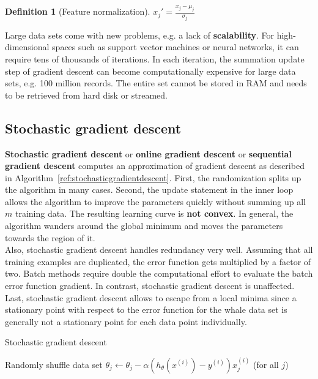 \documentclass{report}
\newtheorem{definition}{Definition}[section]
\begin{document}
\begin{definition}[Feature normalization]
$x_j' = \frac{x_j - \mu_j}{\sigma_j}$
\end{definition}

Large data sets come with new problems, e.g. a lack of {\bf scalability}.
For high-dimensional spaces such as support vector machines or neural networks, it can require tens of thousands of iterations.
In each iteration, the summation update step of gradient descent can become computationally expensive for large data sets, e.g. 100 million records.
The entire set cannot be stored in RAM and needs to be retrieved from hard disk or streamed.


\subsection{Stochastic gradient descent}

{\bf Stochastic gradient descent} or {\bf online gradient descent} or {\bf sequential gradient descent} computes an approximation of gradient descent as described in Algorithm~\ref{ref:stochasticgradientdescent}.
First, the randomization splits up the algorithm in many cases.
Second, the update statement in the inner loop allows the algorithm to improve the parameters quickly without summing up all $m$ training data.
The resulting learning curve is {\bf not convex}.
In general, the algorithm wanders around the global minimum and moves the parameters towards the region of it. \\
Also, stochastic gradient descent handles redundancy very well. Assuming that all training examples are duplicated, the error function gets multiplied by a factor of two. Batch methods require double the computational effort to evaluate the batch error function gradient. In contrast, stochastic gradient descent is unaffected.
Last, stochastic gradient descent allows to escape from a local minima since a stationary point with respect to the error function for the whale data set is generally not a stationary point for each data point individually.

\begin{algorithm}
\caption{Stochastic gradient descent}
\label{ref:stochasticgradientdescent}
\begin{algorithmic}
\State Randomly shuffle data set
\Repeat
{}
\State $\theta_j  \gets \theta_j - \alpha (h_\theta(x^{(i)})-y^{(i)})x_j^{(i)}$ (for all $j$)
\EndFor
{}
\end{algorithmic}
\end{algorithm}
\end{document}
